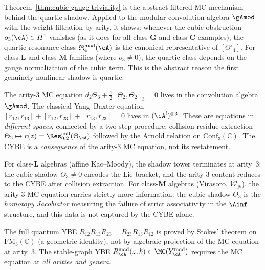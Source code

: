 \begin{remark}
\label{rem:quartic-canonical-class}
Theorem~\ref{thm:cubic-gauge-triviality} is the abstract
filtered MC mechanism behind the quartic shadow.  Applied to
the modular convolution algebra $\gAmod$ with the weight
filtration by arity, it shows: whenever the cubic obstruction
$o_3(\cA) \in H^1$ vanishes (as it does for all
class-$\mathbf{G}$ and class-$\mathbf{C}$ examples), the
quartic resonance class
$\mathfrak{R}_4^{\mathrm{mod}}(\cA)$ is the canonical
representative of $[\Theta'_4]$.  For class-$\mathbf{L}$ and
class-$\mathbf{M}$ families (where $o_3 \neq 0$), the quartic
class depends on the gauge normalization of the cubic term.
This is the abstract reason the first genuinely nonlinear
shadow is quartic.
\end{remark}

\begin{remark}
\label{rem:arity3-vs-cybe}
The arity-$3$ MC equation
$d_2\Theta_3 + \frac{1}{2}[\Theta_2, \Theta_2]_3 = 0$
lives in the convolution algebra $\gAmod$.  The classical
Yang--Baxter equation
$[r_{12}, r_{13}] + [r_{12}, r_{23}] + [r_{13}, r_{23}] = 0$
lives in $(\cA^!)^{\otimes 3}$.  These are equations in
\emph{different spaces}, connected by a two-step procedure:
collision residue extraction
$\Theta_2 \mapsto r(z) = \Res^{\mathrm{coll}}_{0,2}(\Theta_\cA)$
followed by the Arnold relation on $\mathrm{Conf}_3(\mathbb{C})$.
The CYBE is a \emph{consequence} of the arity-$3$ MC equation,
not its restatement.

For class-$\mathbf{L}$ algebras (affine Kac--Moody),
the shadow tower terminates at arity~$3$: the cubic shadow
$\Theta_3 \neq 0$ encodes the Lie bracket, and the arity-$3$
content reduces to the CYBE after collision extraction.
For class-$\mathbf{M}$ algebras (Virasoro, $\mathcal{W}_N$),
the arity-$3$ MC equation carries strictly more information:
the cubic shadow $\Theta_3$ is the \emph{homotopy Jacobiator}
measuring the failure of strict associativity in the $\Ainf$
structure, and this data is not captured by the CYBE alone.

The full quantum YBE
$R_{12}R_{13}R_{23} = R_{23}R_{13}R_{12}$
is proved by Stokes' theorem on $\mathrm{FM}_3(\mathbb{C})$
(a geometric identity), not by algebraic projection of
the MC equation at arity~$3$.  The stable-graph YBE
$R^{\mathrm{mod}}_\cA(z;\hbar) \in \MC(Y^{\mathrm{mod}}_\cA)$
requires the MC equation at \emph{all arities and genera}.
\end{remark}

